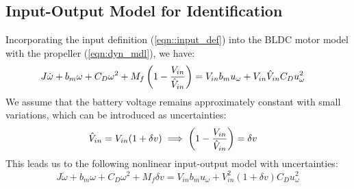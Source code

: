 \subsection{Input-Output Model for Identification}
Incorporating the input definition (\ref{eqn::input_def}) into the BLDC motor model with the propeller (\ref{eqn:dyn_mdl}), we have:
{\small
\begin{align}
    &J \dot \omega + b_m \omega + C_D \omega^2 + M_f \left( 1 - \frac{V_{in}}{\hat V_{in}} \right) = V_{in} b_m u_\omega + V_{in} \hat V_{in} C_D u_\omega^2
    \label{eqn::calib_mdl}
\end{align}
}
We assume that the battery voltage remains approximately constant with small variations, which can be introduced as uncertainties:
\begin{align}
    \hat V_{in} &= V_{in} ( 1 + \delta v)
    \implies \left( 1 - \frac{V_{in}}{\hat V_{in}} \right) = \delta v
\end{align}
This leads us to the following nonlinear input-output model with uncertainties:
\begin{equation}\label{eqn::nl_model}
    J \dot \omega + b_m \omega + C_D \omega^2 + M_f \delta v = V_{in} b_m u_\omega + V_{in}^2 (1 + \delta v) C_D u_\omega^2
\end{equation}
